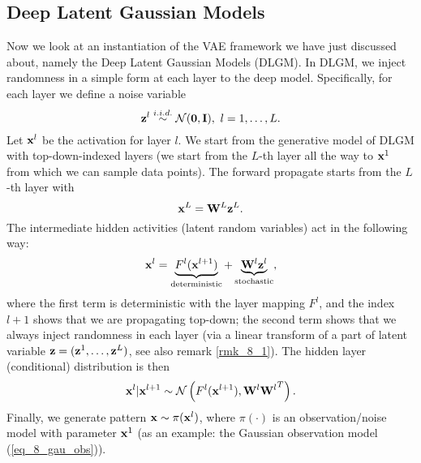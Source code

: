 \documentclass[../main.tex]{subfiles}
\begin{document}
\subsection{Deep Latent Gaussian Models}
Now we look at an instantiation of the VAE framework we have just discussed about, namely the Deep Latent Gaussian Models (DLGM). In DLGM, we inject randomness in a simple form at each layer to the deep model.  Specifically, for each layer we define a noise variable
\begin{equation*}
{\bf z}^l\overset{i.i.d.}{\sim}\mathcal{N}({\bf 0,I}),\ l=1,\dots,L.
\end{equation*}
Let ${\bf x}^l$ be the activation for layer $l$. We start from the generative model of DLGM with top-down-indexed layers (we start from the $L$-th layer all the way to ${\bf x}^1$ from which we can sample data points). The forward propagate starts from the $L$-th layer with
\begin{equation*}
{\bf x}^L={\bf W}^L{\bf z}^L.
\end{equation*}
The intermediate hidden activities (latent random variables) act in the following way:
\begin{equation*}
{\bf x}^l=\underbrace{F^l({\bf x}^{l+1})}_{\rm deterministic}+\underbrace{{\bf W}^l{\bf z}^l}_{\rm stochastic},
\end{equation*}
where the first term is deterministic with the layer mapping $F^l$, and the index $l+1$ shows that we are propagating top-down; the second term shows that we always inject randomness in each layer (via a linear transform of a part of latent variable ${\bf z}=({\bf z}^1,\dots,{\bf z}^L)$, see also remark \ref{rmk_8_1}). The hidden layer (conditional) distribution is then
\begin{equation*}
{\bf x}^l|{\bf x}^{l+1}\sim \mathcal{N}\left(F^l({\bf x}^{l+1}),{{\bf W}^l{\bf W}^l}^T\right).
\end{equation*}
Finally, we generate pattern ${\bf x}\sim \pi({\bf x}^l)$, where $\pi(\cdot)$ is an observation/noise model with parameter ${\bf x}^1$ (as an example: the Gaussian observation model (\ref{eq_8_gau_obs})).
\end{document}
